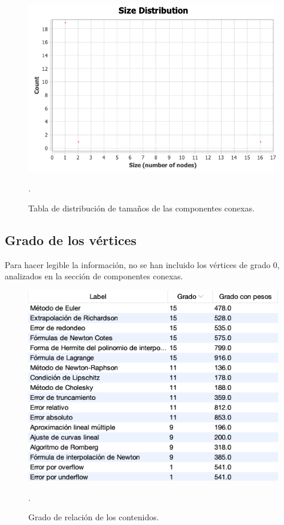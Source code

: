 \documentclass[a4paper,10pt,twocolumn]{article}
\begin{document}
        \begin{figure}[h!]
            \centering
            \includegraphics[scale=0.35]{cc-size-distribution.png}
            \caption{Tabla de distribución de tamaños de las componentes conexas. \label{fig:ex}}
.        \end{figure}

        \subsection{Grado de los vértices}

        Para hacer legible la información, no se han incluido los vértices de grado 0, analizados en la sección de componentes conexas.

        \begin{figure}[h!]
            \centering
            \includegraphics[scale=0.55]{vertex_deg.png}
            \caption{Grado de relación de los contenidos. \label{fig:ex}}
.        \end{figure}
\end{document}
